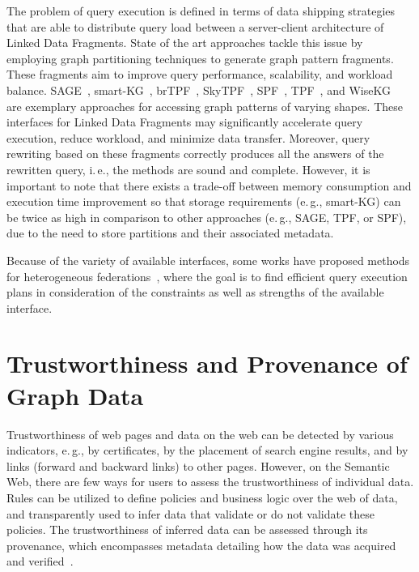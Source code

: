 \documentclass[a4paper,USenglish]{tgdk-v2021}
\begin{document}
The problem of query execution is defined in terms of data shipping strategies that are able to distribute query load between a server-client architecture of Linked Data Fragments.
State of the art approaches tackle this issue by employing graph partitioning techniques to generate graph pattern fragments.
These fragments aim to improve query performance, scalability, and workload balance. 
SAGE~\cite{DBLP:conf/f-ic/MinierSM19}, smart-KG~\cite{DBLP:conf/www/AzzamFABP20}, brTPF~\cite{DBLP:journals/corr/HartigA16}, SkyTPF~\cite{DBLP:conf/semweb/KelesH19}, SPF~\cite{DBLP:journals/corr/abs-2002-09172}, TPF~\cite{DBLP:journals/ws/VerborghSHHVMHC16}, and WiseKG~\cite{DBLP:conf/www/AzzamAMKPH21} are exemplary approaches for accessing graph patterns of varying shapes.
These interfaces for Linked Data Fragments may significantly accelerate query execution, reduce workload, and minimize data transfer.
Moreover, query rewriting based on these fragments correctly produces all the answers of the rewritten query, i.\,e., the methods are sound and complete.
However, it is important to note that there exists a trade-off between memory consumption and execution time improvement so that storage requirements (e.\,g., smart-KG) can be twice as high in comparison to other approaches (e.\,g., SAGE, TPF, or SPF), due to the need to store partitions and their associated metadata. 

Because of the variety of available interfaces, some works have proposed methods for heterogeneous federations~\cite{DBLP:conf/www/HelingA22,DBLP:conf/semweb/MontoyaKH19,DBLP:conf/semweb/MontoyaAH18a,DBLP:conf/esws/ChengH22}, where the goal is to find efficient query execution plans in consideration of the constraints as well as strengths of the available interface.

\section{Trustworthiness and Provenance of Graph Data}
\label{sec:trustprovenance}
Trustworthiness of web pages and data on the web can be detected by various indicators, e.\,g., by certificates, by the placement of search engine results, and by links (forward and backward links) to other pages.
However, on the Semantic Web, there are few ways for users to assess the trustworthiness of individual data. 
Rules can be utilized to define policies and business logic over the web of data, and transparently used to infer data that validate or do not validate these policies.
The trustworthiness of inferred data can be assessed through its provenance, which encompasses metadata detailing how the data was acquired and verified~\cite{DBLP:conf/rr/KhandelwalJK11}.
\end{document}
